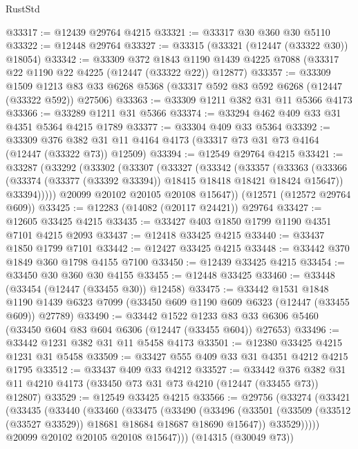 \begin{lexlean}{RustStd}
\begin{coremodule}
@33317 := @12439 @29764 @4215
@33321 := @33317 @30 @360 @30 @5110
@33322 := @12448 @29764
@33327 := @33315 (@33321 (@12447 (@33322 @30)) @18054)
@33342 := @33309
    @372
    @1843
    @1190
    @1439
    @4225
    @7088
    (@33317 @22 @1190 @22 @4225 (@12447 (@33322 @22)) @12877)
@33357 := @33309
    @1509
    @1213
    @83
    @33
    @6268
    @5368
    (@33317 @592 @83 @592 @6268 (@12447 (@33322 @592)) @27506)
@33363 := @33309 @1211 @382 @31 @11 @5366 @4173
@33366 := @33289 @1211 @31 @5366
@33374 := @33294 @462 @409 @33 @31 @4351 @5364 @4215 @1789
@33377 := @33304 @409 @33 @5364
@33392 := @33309
    @376
    @382
    @31
    @11
    @4164
    @4173
    (@33317 @73 @31 @73 @4164 (@12447 (@33322 @73)) @12509)
@33394 := @12549 @29764 @4215
@33421 := @33287
    (@33292
      (@33302
        (@33307
          (@33327
            (@33342
              (@33357
                (@33363
                  (@33366 (@33374 (@33377 (@33392 @33394)) @18415 @18418 @18421 @18424 @15647))
                  @33394)))))
        @20099
        @20102
        @20105
        @20108
        @15647))
    (@12571 (@12572 @29764 @609))
@33425 := @12283 (@14082 (@20117 @24421)) @29764
@33427 := @12605 @33425 @4215
@33435 := @33427 @403 @1850 @1799 @1190 @4351 @7101 @4215 @2093
@33437 := @12418 @33425 @4215
@33440 := @33437 @1850 @1799 @7101
@33442 := @12427 @33425 @4215
@33448 := @33442 @370 @1849 @360 @1798 @4155 @7100
@33450 := @12439 @33425 @4215
@33454 := @33450 @30 @360 @30 @4155
@33455 := @12448 @33425
@33460 := @33448 (@33454 (@12447 (@33455 @30)) @12458)
@33475 := @33442
    @1531
    @1848
    @1190
    @1439
    @6323
    @7099
    (@33450 @609 @1190 @609 @6323 (@12447 (@33455 @609)) @27789)
@33490 := @33442
    @1522
    @1233
    @83
    @33
    @6306
    @5460
    (@33450 @604 @83 @604 @6306 (@12447 (@33455 @604)) @27653)
@33496 := @33442 @1231 @382 @31 @11 @5458 @4173
@33501 := @12380 @33425 @4215 @1231 @31 @5458
@33509 := @33427 @555 @409 @33 @31 @4351 @4212 @4215 @1795
@33512 := @33437 @409 @33 @4212
@33527 := @33442
    @376
    @382
    @31
    @11
    @4210
    @4173
    (@33450 @73 @31 @73 @4210 (@12447 (@33455 @73)) @12807)
@33529 := @12549 @33425 @4215
@33566 := @29756
    (@33274
      (@33421
        (@33435
          (@33440
            (@33460
              (@33475
                (@33490
                  (@33496
                    (@33501 (@33509 (@33512 (@33527 @33529)) @18681 @18684 @18687 @18690 @15647))
                    @33529)))))
          @20099
          @20102
          @20105
          @20108
          @15647)))
    (@14315 (@30049 @73))

\end{coremodule}
\end{lexlean}
